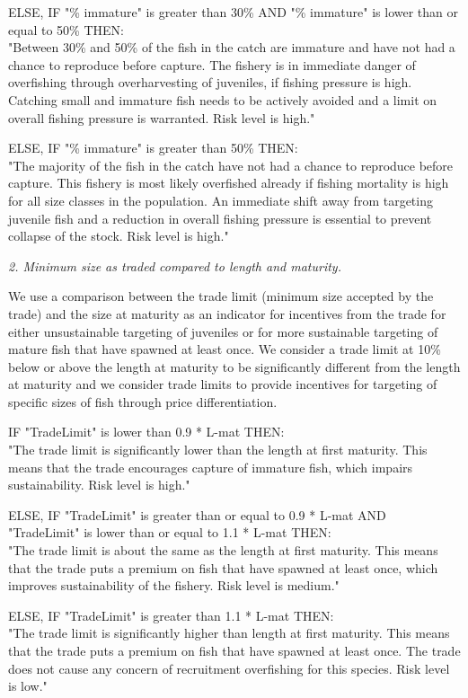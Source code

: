 ELSE, IF "\% immature" is greater than 30\% AND "\% immature" is lower than or equal to 50\% THEN:\\[0cm]
"Between 30\% and 50\% of the fish in the catch are immature and have not had a chance to reproduce before capture. The fishery is in immediate danger of overfishing through overharvesting of juveniles, if fishing pressure is high.  Catching small and immature fish needs to be actively avoided and a limit on overall fishing pressure is warranted. Risk level is high."

ELSE, IF "\% immature" is greater than 50\% THEN:\\[0cm]
"The majority of the fish in the catch have not had a chance to reproduce before capture. This fishery is most likely overfished already if fishing mortality is high for all size classes in the population. An immediate shift away from targeting juvenile fish and a reduction in overall fishing pressure is essential to prevent collapse of the stock. Risk level is high."

\textit{2. Minimum size as traded compared to length and maturity.}

We use a comparison between the trade limit (minimum size accepted by the trade) and the size at maturity as an indicator for incentives from the trade for either unsustainable targeting of juveniles or for more sustainable targeting of mature fish that have spawned at least once. We consider a trade limit at 10\% below or above the length at maturity to be significantly different from the length at maturity and we consider trade limits to provide incentives for targeting of specific sizes of fish through price differentiation.

IF "TradeLimit" is lower than 0.9 * L-mat THEN:\\[0cm]
"The trade limit is significantly lower than the length at first maturity.  This means that the trade encourages capture of immature fish, which impairs sustainability. Risk level is high."

\clearpage
\newpage

ELSE, IF "TradeLimit" is greater than or equal to 0.9 * L-mat AND "TradeLimit" is lower than or equal to 1.1 * L-mat THEN:\\[0cm]
"The trade limit is about the same as the length at first maturity.  This means that the trade puts a premium on fish that have spawned at least once, which improves sustainability of the fishery. Risk level is medium."

ELSE, IF "TradeLimit" is greater than 1.1 * L-mat THEN:\\[0cm]
"The trade limit is significantly higher than length at first maturity.  This means that the trade puts a premium on fish that have spawned at least once. The trade does not cause any concern of recruitment overfishing for this species. Risk level is low."

